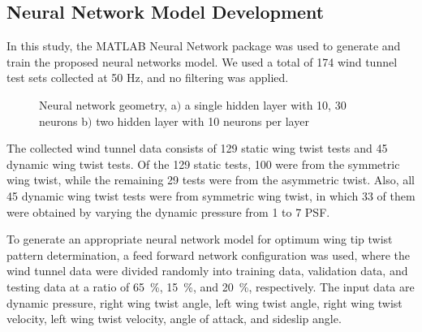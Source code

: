 \documentclass[11pt]{ucthesis}
\begin{document}
\subsection{Neural Network Model Development}
\label{sec:NN}

In this study,  the MATLAB Neural Network package was used to generate and train the proposed neural networks model. We used a total of 174 wind tunnel test sets collected at 50 Hz, and no filtering was applied. 

\begin{figure}[thpb]
\centering
{} 
\caption{Neural network geometry, a$)$ a single hidden layer with 10, 30 neurons b$)$ two hidden layer with 10 neurons per layer}
\label{fig:NNconfig}
\end{figure}

The collected wind tunnel data consists of 129 static wing twist tests and 45 dynamic wing twist tests. Of the 129 static tests, 100 were from the symmetric wing twist, while the remaining 29 tests were from the asymmetric twist. Also, all 45 dynamic wing twist tests were from symmetric wing twist, in which 33 of them were obtained by varying the dynamic pressure from 1 to 7 PSF. 

To generate an appropriate neural network model for optimum wing tip twist pattern determination, a feed forward network configuration was used, where the wind tunnel data were divided randomly into training data, validation data, and testing data at a ratio of 65~\%, 15~\%, and 20~\%, respectively. The input data are dynamic pressure, right wing twist angle, left wing twist angle, right wing twist velocity, left wing twist velocity, angle of attack, and sideslip angle.
\end{document}
